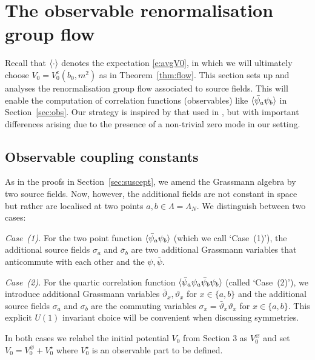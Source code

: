 \documentclass[11pt]{amsart}
\numberwithin{equation}{section}
\numberwithin{theorem}{section}
\newcommand{\1}{{\bf 1}}
\newcommand{\obs}{\star}
\newcommand{\Vbulk}{V^\varnothing}
\newcommand{\Vobs}{V^\obs}
\begin{document}
\section{The observable renormalisation group flow}
\label{sec:obs-flow}

Recall that $\langle \cdot \rangle$ denotes the expectation \eqref{e:avgV0}, in
which we will ultimately choose $V_0=V_0^c(b_0,m^2)$ as in
Theorem~\ref{thm:flow}. This section sets up and analyses the
renormalisation group flow associated to source fields. This will
enable the computation of correlation functions (observables) like
$\langle \bar\psi_{a}\psi_{b} \rangle$ in Section~\ref{sec:obs}. Our strategy is
inspired by that used in \cite{MR3345374,MR3459163}, but with
important differences arising due to the presence of a non-trivial
zero mode in our setting.


\subsection{Observable coupling constants}
\label{sec:obsfields}

As in the proofs in Section~\ref{sec:suscept}, we amend the Grassmann
algebra by two source fields.  Now, however, the additional fields
are not constant in space but rather are localised at two points
$a,b\in\Lambda = \Lambda_{N}$.
We distinguish between two cases:

\medskip \noindent
\emph{Case~(1).}
%
For the two point function $\langle \bar\psi_a\psi_b \rangle$
(which we call `Case~(1)'), the additional source fields $\sigma_a$ and
$\bar\sigma_b$ are two additional Grassmann variables that anticommute
with each other and the $\psi,\bar\psi$.

\medskip \noindent
\emph{Case~(2).}
For the quartic correlation
function $\langle \bar\psi_a\psi_a\bar\psi_b\psi_b \rangle$ (called `Case~(2)'),
we introduce additional Grassmann variables
$\bar\vartheta_{x},\vartheta_{x}$ for $x\in \{a,b\}$ and the
additional source fields $\sigma_a$ and $\sigma_b$ are the commuting
variables $\sigma_{x}=\bar\vartheta_{x}\vartheta_{x}$ for $x\in \{a,b\}$.
This explicit $U(1)$ invariant choice will be convenient when discussing symmetries.

\medskip


In both cases we relabel the initial potential $V_0$ from Section $3$
as $\Vbulk_0$ and set $V_0 = \Vbulk_0+\Vobs_0$ where $\Vobs_0$ is an
observable part to be defined.
\end{document}
